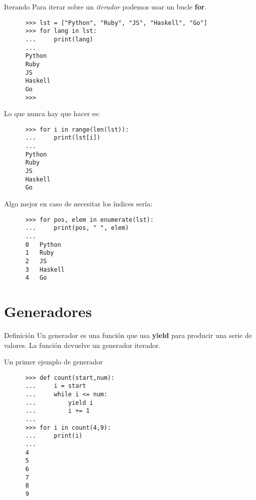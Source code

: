\documentclass[spanish]{beamer}
\begin{document}
  \begin{frame}[fragile]{Iterando}
    Para iterar sobre un \textit{iterador} podemos usar un bucle \textbf{for}.

    \begin{lstlisting}
      >>> lst = ["Python", "Ruby", "JS", "Haskell", "Go"]
      >>> for lang in lst:
      ...     print(lang)
      ... 
      Python
      Ruby
      JS
      Haskell
      Go
      >>> 
    \end{lstlisting}
  \end{frame}

  \begin{frame}[fragile]
    Lo que nunca hay que hacer es:

    \begin{lstlisting}
      >>> for i in range(len(lst)):
      ...     print(lst[i])
      ... 
      Python
      Ruby
      JS
      Haskell
      Go

    \end{lstlisting}

    Algo mejor en caso de necesitar los índices sería:

    \begin{lstlisting}
      >>> for pos, elem in enumerate(lst):
      ...     print(pos, " ", elem)
      ... 
      0   Python
      1   Ruby
      2   JS
      3   Haskell
      4   Go
    \end{lstlisting}
  \end{frame}

  \section{Generadores}
  \begin{frame}{Definición}
    Un generador es una función que usa \textbf{yield} para producir
    una serie de valores. La función devuelve un generador iterador.
  \end{frame}

  \begin{frame}[fragile]
    Un primer ejemplo de generador
    \begin{lstlisting}
      >>> def count(start,num):
      ...     i = start
      ...     while i <= num:
      ...         yield i
      ...         i += 1
      ... 
      >>> for i in count(4,9):
      ...     print(i)
      ... 
      4
      5
      6
      7
      8
      9

    \end{lstlisting}
  \end{frame}
\end{document}
